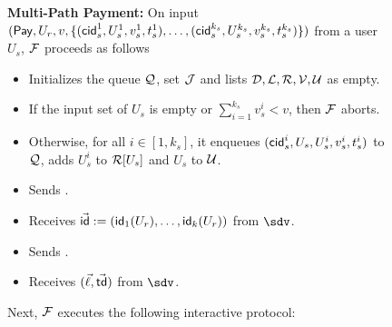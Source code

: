 \begin{figure*}[!t]
{{\textbf{Multi-Path Payment:} On input $(\mathsf{Pay}, U_r, v, \{(\mathsf{cid}_s^1, U_s^1,v_s^1,t_s^1),
\ldots,(\mathsf{cid}_s^{k_s}, U_s^{k_s},v_s^{k_s},t_s^{k_s})\})$ from a user $U_s$, $\mathcal{F}$ proceeds 
as follows 
\begin{itemize}[label=-]
	\item Initializes the queue $\mathcal{Q}$, set $\mathcal{J}$ and lists $\mathcal{D}, \mathcal{L}, \mathcal{R}, \mathcal{V}, \mathcal{U}$ as empty.
	\item If the input set of $U_s$ is empty or $\textstyle\sum_{i=1}^{k_s} v_s^i < v$, then 
	$\mathcal{F}$ aborts.
	\item Otherwise, for all $i \in [1,k_s]$, it enqueues $(\mathsf{cid}_s^i, U_s,U_s^i,v_s^i,t_s^i)$ 
	to $\mathcal{Q}$, adds $U_s^i$ to $\mathcal{R}[U_s]$ and $U_s$ to $\mathcal{U}$.
	\item Sends .
	\item Receives $\vec{\mathsf{id}} := (\mathsf{id}_1(U_r),\ldots,\mathsf{id}_k(U_r))$ from $\sdv$.
	\item Sends .
	\item Receives $(\vec{\ell},\vec{\mathsf{td}})$ from $\sdv$.
\end{itemize}

Next, $\mathcal{F}$ executes the following interactive protocol:

\begin{enumerate}
	

\end{enumerate}}}
\end{figure*}

